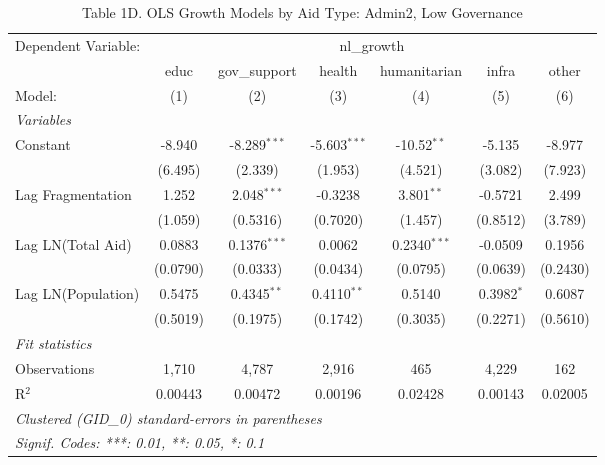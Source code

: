 \begin{table}[htbp]
   \caption{Table 1D. OLS Growth Models by Aid Type: Admin2, Low Governance}
   \centering
   \begin{tabular}{lcccccc}
      \tabularnewline \midrule \midrule
      Dependent Variable: & \multicolumn{6}{c}{nl\_growth}\\
                         & educ     & gov\_support   & health         & humanitarian   & infra        & other \\   
      Model:             & (1)      & (2)            & (3)            & (4)            & (5)          & (6)\\  
      \midrule
      \emph{Variables}\\
      Constant           & -8.940   & -8.289$^{***}$ & -5.603$^{***}$ & -10.52$^{**}$  & -5.135       & -8.977\\   
                         & (6.495)  & (2.339)        & (1.953)        & (4.521)        & (3.082)      & (7.923)\\   
      Lag Fragmentation  & 1.252    & 2.048$^{***}$  & -0.3238        & 3.801$^{**}$   & -0.5721      & 2.499\\   
                         & (1.059)  & (0.5316)       & (0.7020)       & (1.457)        & (0.8512)     & (3.789)\\   
      Lag LN(Total Aid)  & 0.0883   & 0.1376$^{***}$ & 0.0062         & 0.2340$^{***}$ & -0.0509      & 0.1956\\   
                         & (0.0790) & (0.0333)       & (0.0434)       & (0.0795)       & (0.0639)     & (0.2430)\\   
      Lag LN(Population) & 0.5475   & 0.4345$^{**}$  & 0.4110$^{**}$  & 0.5140         & 0.3982$^{*}$ & 0.6087\\   
                         & (0.5019) & (0.1975)       & (0.1742)       & (0.3035)       & (0.2271)     & (0.5610)\\   
      \midrule
      \emph{Fit statistics}\\
      Observations       & 1,710    & 4,787          & 2,916          & 465            & 4,229        & 162\\  
      R$^2$              & 0.00443  & 0.00472        & 0.00196        & 0.02428        & 0.00143      & 0.02005\\  
      \midrule \midrule
      \multicolumn{7}{l}{\emph{Clustered (GID\_0) standard-errors in parentheses}}\\
      \multicolumn{7}{l}{\emph{Signif. Codes: ***: 0.01, **: 0.05, *: 0.1}}\\
   \end{tabular}
\end{table}



